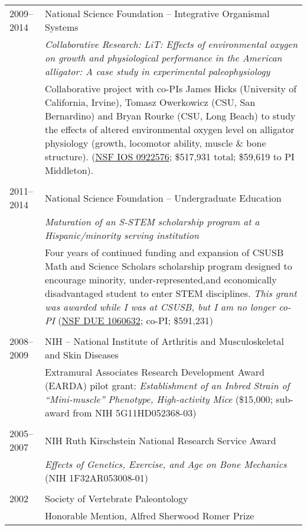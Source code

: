\begin{longtable}{@{}lX@{}}
    \\
    2009--2014 & National Science Foundation -- Integrative Organismal Systems\\
    & \textit{Collaborative Research: LiT: Effects of environmental oxygen on growth and physiological performance in the American alligator: A case study in experimental paleophysiology}\\[0.5pc]
    & Collaborative project with co-PIs James Hicks (University of California, Irvine), Tomasz Owerkowicz (CSU, San Bernardino) and Bryan Rourke (CSU, Long Beach) to study the effects of altered environmental oxygen level on alligator physiology (growth, locomotor ability, muscle \& bone structure). (\href{http://www.nsf.gov/awardsearch/showAward.do?AwardNumber=0922576}{NSF IOS 0922576}; \$517,931 total; \$59,619 to PI Middleton).\\
    \\
    2011--2014 & National Science Foundation -- Undergraduate Education\\
    & \textit{Maturation of an S-STEM scholarship program at a Hispanic/minority serving institution}\\[0.5pc]
    & Four years of continued funding and expansion of CSUSB Math and Science Scholars scholarship program designed to encourage minority, under-represented,and economically disadvantaged student to enter STEM disciplines. \emph{This grant was awarded while I was at CSUSB, but I am no longer co-PI} (\href{http://www.nsf.gov/awardsearch/showAward.do?AwardNumber=1060632}{NSF DUE 1060632}; co-PI; \$591,231)\\
    \\
    2008--2009 & NIH -- National Institute of Arthritis and Musculoskeletal and Skin Diseases\\
    & Extramural Associates Research Development Award (EARDA) pilot grant: \textit{Establishment of an Inbred Strain of ``Mini-muscle'' Phenotype, High-activity Mice} (\$15,000; sub-award from NIH 5G11HD052368-03)\\
    \\
    2005--2007 & NIH Ruth Kirschstein National Research Service Award\\
    & \textit{Effects of Genetics, Exercise, and Age on Bone Mechanics} (NIH 1F32AR053008-01)\\
    \\
    2002 & Society of Vertebrate Paleontology\\
    & Honorable Mention, Alfred Sherwood Romer Prize\\

\end{longtable}
